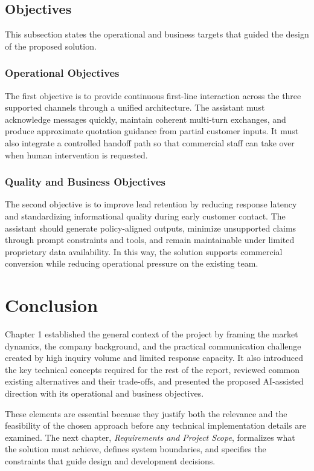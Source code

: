 \subsection{Objectives}
This subsection states the operational and business targets that guided the design of the proposed solution.

\subsubsection{Operational Objectives}
The first objective is to provide continuous first-line interaction across the three supported channels through a unified architecture. The assistant must acknowledge messages quickly, maintain coherent multi-turn exchanges, and produce approximate quotation guidance from partial customer inputs. It must also integrate a controlled handoff path so that commercial staff can take over when human intervention is requested.

\subsubsection{Quality and Business Objectives}
The second objective is to improve lead retention by reducing response latency and standardizing informational quality during early customer contact. The assistant should generate policy-aligned outputs, minimize unsupported claims through prompt constraints and tools, and remain maintainable under limited proprietary data availability. In this way, the solution supports commercial conversion while reducing operational pressure on the existing team.


\section{Conclusion}
Chapter 1 established the general context of the project by framing the market dynamics, the company background, and the practical communication challenge created by high inquiry volume and limited response capacity. It also introduced the key technical concepts required for the rest of the report, reviewed common existing alternatives and their trade-offs, and presented the proposed AI-assisted direction with its operational and business objectives.

These elements are essential because they justify both the relevance and the feasibility of the chosen approach before any technical implementation details are examined. The next chapter, \textit{Requirements and Project Scope}, formalizes what the solution must achieve, defines system boundaries, and specifies the constraints that guide design and development decisions.

